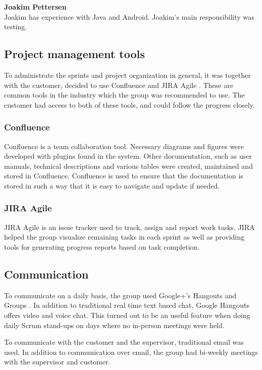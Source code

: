 \noindent \textbf{Joakim Pettersen} \\
Joakim has experience with Java and Android. Joakim's main responsibility was testing.
\\


\subsection{Project management tools}
\label{project_management_tools}
To administrate the sprints and project organization in general, it was together with the customer, decided to use Confluence \cite{confluence} and JIRA Agile \cite{jira}. These are common tools in the industry which the group was recommended to use. The customer had access to both of these tools, and could follow the progress closely.

\subsubsection{Confluence}
Confluence is a team collaboration tool. Necessary diagrams and figures were developed with plugins found in the system. Other documentation, such as user manuals, technical descriptions and various tables were created, maintained and stored in Confluence. Confluence is used to ensure that the documentation is stored in such a way that it is easy to navigate and update if needed.

\subsubsection{JIRA Agile}
JIRA Agile is an issue tracker used to track, assign and report work tasks. JIRA helped the group visualize remaining tasks in each sprint as well as providing tools for generating progress reports based on task completion.


\subsection{Communication}
To communicate on a daily basis, the group used Google+'s Hangouts and Groups \cite{hangouts}. In addition to traditional real time text based chat, Google Hangouts offers video and voice chat. This turned out to be an useful feature when doing daily Scrum stand-ups on days where no in-person meetings were held.

To communicate with the customer and the supervisor, traditional email was used. In addition to communication over email, the group had bi-weekly meetings with the supervisor and customer.

